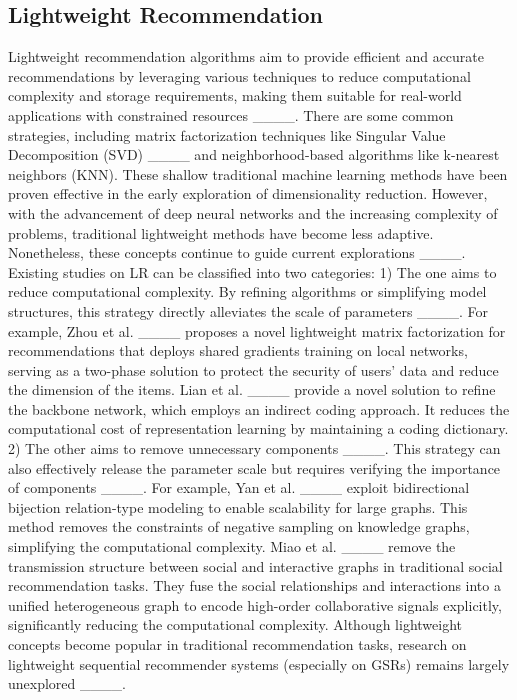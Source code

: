 \subsection{Lightweight Recommendation}
\noindent Lightweight recommendation algorithms aim to provide efficient and accurate recommendations by leveraging various techniques to reduce computational complexity and storage requirements, making them suitable for real-world applications with constrained resources ____. There are some common strategies, including matrix factorization techniques like Singular Value Decomposition (SVD) ____ and neighborhood-based algorithms like k-nearest neighbors (KNN). These shallow traditional machine learning methods have been proven effective in the early exploration of dimensionality reduction. However, with the advancement of deep neural networks and the increasing complexity of problems, traditional lightweight methods have become less adaptive. Nonetheless, these concepts continue to guide current explorations ____. Existing studies on \ac{LR} can be classified into two categories: 
1) The one aims to reduce computational complexity. By refining algorithms or simplifying model structures, this strategy directly alleviates the scale of parameters ____. 
For example, Zhou et al. ____ proposes a novel lightweight matrix factorization for recommendations that deploys shared gradients training on local networks, serving as a two-phase solution to protect the security of users’ data and reduce the dimension of the items. 
Lian et al. ____ provide a novel solution to refine the backbone network, which employs an indirect coding approach. It reduces the computational cost of representation learning by maintaining a coding dictionary.
2) The other aims to remove unnecessary components ____. This strategy can also effectively release the parameter scale but requires verifying the importance of components ____. For example, Yan et al. ____ exploit bidirectional bijection relation-type modeling to enable scalability for large graphs. This method removes the constraints of negative sampling on knowledge graphs, simplifying the computational complexity. 
Miao et al. ____ remove the transmission structure between social and interactive graphs in traditional social recommendation tasks. They fuse the social relationships and interactions into a unified heterogeneous graph to encode high-order collaborative signals explicitly, significantly reducing the computational complexity.  
Although lightweight concepts become popular in traditional recommendation tasks, research on lightweight sequential recommender systems (especially on GSRs) remains largely unexplored ____.

